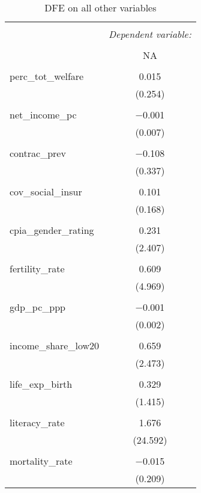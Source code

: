 
\begin{table}[!htbp] \centering 
  \caption{DFE on all other variables} 
  \label{} 
\begin{tabular}{@{\extracolsep{5pt}}lc} 
\\[-1.8ex]\hline 
\hline \\[-1.8ex] 
 & \multicolumn{1}{c}{\textit{Dependent variable:}} \\ 
\cline{2-2} 
\\[-1.8ex] & NA \\ 
\hline \\[-1.8ex] 
 perc\_tot\_welfare & 0.015 \\ 
  & (0.254) \\ 
  & \\ 
 net\_income\_pc & $-$0.001 \\ 
  & (0.007) \\ 
  & \\ 
 contrac\_prev & $-$0.108 \\ 
  & (0.337) \\ 
  & \\ 
 cov\_social\_insur & 0.101 \\ 
  & (0.168) \\ 
  & \\ 
 cpia\_gender\_rating & 0.231 \\ 
  & (2.407) \\ 
  & \\ 
 fertility\_rate & 0.609 \\ 
  & (4.969) \\ 
  & \\ 
 gdp\_pc\_ppp & $-$0.001 \\ 
  & (0.002) \\ 
  & \\ 
 income\_share\_low20 & 0.659 \\ 
  & (2.473) \\ 
  & \\ 
 life\_exp\_birth & 0.329 \\ 
  & (1.415) \\ 
  & \\ 
 literacy\_rate & 1.676 \\ 
  & (24.592) \\ 
  & \\ 
 mortality\_rate & $-$0.015 \\ 
  & (0.209) \\ 

\end{tabular}
\end{table}
